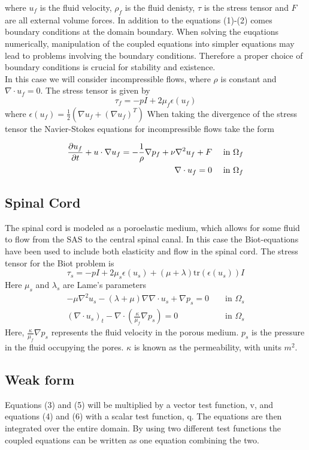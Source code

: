 where $u_f$ is the fluid velocity, $\rho_f$ is the fluid denisty, $\tau$ is the stress tensor and $F$ are all external volume forces. In addition to the equations (1)-(2) comes boundary conditions at the domain boundary. When solving the euqations numerically, manipulation of the coupled equations into simpler equations may lead to problems involving the boundary conditions. Therefore a proper choice of boundary conditions is crucial for stability and existence. 
\\
In this case we will consider incompressible flows, where $\rho$ is constant and $\nabla \cdot u_f = 0$. The stress tensor is given by
\[ \tau_f = -pI + 2 \mu_f \epsilon(u_f) \]
where $\epsilon(u_f) = \frac{1}{2}(\nabla u_f + (\nabla u_f)^T)$
When taking the divergence of the stress tensor the Navier-Stokes equations for incompressible flows take the form

\begin{align}
	\frac{\partial u_f}{\partial t} + u\cdot \nabla u_f = -\frac{1}{\rho}\nabla p_f + \nu \nabla ^2 u_f + F && 	\text{ in } \Omega_f 
	\\
	\nabla \cdot u_f = 0 && \text{ in } \Omega_f
\end{align}



\subsection*{Spinal Cord}
The spinal cord is modeled as a poroelastic medium, which allows for some fluid to flow from the SAS to the central spinal canal. In this case the Biot-equations have been used to include both elasticity and flow in the spinal cord. The stress tensor for the Biot problem is 
\[ \tau_s = -pI + 2\mu_s\epsilon(u_s) + (\mu + \lambda)\text{tr}(\epsilon(u_s))I  \]
Here $\mu_s$ and $\lambda_s$ are Lame's parameters
\begin{align}
	 - \mu \nabla ^2 u_s
	 - (\lambda + \mu)\nabla \nabla \cdot u_s
	 + \nabla p_s = 0 		&& \text{ in } \Omega_s \\
	 (\nabla \cdot u_s)_t
	 - \nabla \cdot (\frac{\kappa}{\mu_f} \nabla p_s) 
	 = 0 && \text{ in } \Omega_s
\end{align}
Here, $\frac{\kappa}{\mu_f} \nabla p_s$ represents the fluid velocity in the porous medium. $p_s$ is the pressure in the fluid occupying the pores. $\kappa$ is known as the permeability, with units $m^2$.

 
\subsection{Weak form}
Equations (3) and (5) will be multiplied by a vector test function, v, and equations (4) and (6) with a scalar test function, q. The equations are then integrated over the entire domain. By using two different test functions the coupled equations can be written as one equation combining the two. \\	
